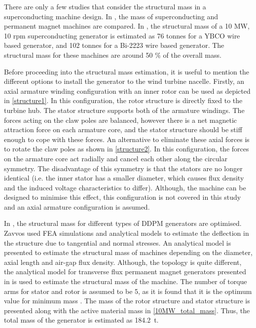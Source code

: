 \documentclass[12pt]{iopart}
\begin{document}
There are only a few studies that consider the structural mass in a superconducting machine design. In \cite{Maples2010}, the mass of superconducting and permanent magnet machines are compared. In \cite{Sung2013}, the structural mass of a 10 MW, 10 rpm superconducting generator is estimated as 76 tonnes for a YBCO wire based generator, and 102 tonnes for a Bi-2223 wire based generator. The structural mass for these machines are around 50 \% of the overall mass.

Before proceeding into the structural mass estimation, it is useful to mention the different options to install the generator to the wind turbine nacelle. Firstly, an axial armature winding configuration with an inner rotor can be used as depicted in \ref{structure1}. In this configuration, the rotor structure is directly fixed to the turbine hub.  The stator structure supports both of the armature windings. The forces acting on the claw poles are balanced, however there is a net magnetic attraction force on each armature core, and the stator structure should be stiff enough to cope with these forces. An alternative to eliminate these axial forces is to rotate the claw poles as shown in \ref{structure2}. In this configuration, the forces on the armature core act radially and cancel each other along the circular symmetry. The disadvantage of this symmetry is that the stators are no longer identical (i.e. the inner stator has a smaller diameter, which causes flux density and the induced voltage characteristics to differ). Although, the machine can be designed to minimise this effect, this configuration is not covered in this study and an axial armature configuration is assumed.


In \cite{Zavvos2013}, the structural mass for different types of DDPM generators are optimised. Zavvos used FEA simulations and analytical models to estimate the deflection in the structure due to tangential and normal stresses. An analytical model is presented to estimate the structural mass of machines depending on the diameter, axial length and air-gap flux density. Although, the topology is quite different, the analytical model for transverse flux permanent magnet generators presented in \cite{Zavvos2013} is used to estimate the structural mass of the machine. The number of torque arms for stator and rotor is assumed to be 5, as it is found that it is the optimum value for minimum mass \cite{Zavvos2013}. The mass of the rotor structure and stator structure is presented along with the active material mass in \ref{10MW_total_mass}. Thus, the total mass of the generator is estimated as 184.2~t.
\end{document}
